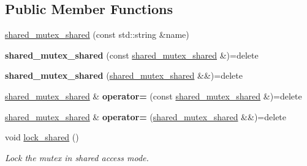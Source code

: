 \subsection*{Public Member Functions}
\begin{DoxyCompactItemize}
\item 
\hyperlink{classcpen333_1_1process_1_1impl_1_1shared__mutex__shared_aa94fee843eb846e57c4ac51589172849}{shared\+\_\+mutex\+\_\+shared} (const std\+::string \&name)
\item 
\mbox{\label{classcpen333_1_1process_1_1impl_1_1shared__mutex__shared_a1a1a4c997212a30de0acffdb151a6784}} 
{\bfseries shared\+\_\+mutex\+\_\+shared} (const \hyperlink{classcpen333_1_1process_1_1impl_1_1shared__mutex__shared}{shared\+\_\+mutex\+\_\+shared} \&)=delete
\item 
\mbox{\label{classcpen333_1_1process_1_1impl_1_1shared__mutex__shared_aeb8440ba1ac5d0f4976f592ca22af915}} 
{\bfseries shared\+\_\+mutex\+\_\+shared} (\hyperlink{classcpen333_1_1process_1_1impl_1_1shared__mutex__shared}{shared\+\_\+mutex\+\_\+shared} \&\&)=delete
\item 
\mbox{\label{classcpen333_1_1process_1_1impl_1_1shared__mutex__shared_af749d860d3161ffe5a5f0059f47b3e6a}} 
\hyperlink{classcpen333_1_1process_1_1impl_1_1shared__mutex__shared}{shared\+\_\+mutex\+\_\+shared} \& {\bfseries operator=} (const \hyperlink{classcpen333_1_1process_1_1impl_1_1shared__mutex__shared}{shared\+\_\+mutex\+\_\+shared} \&)=delete
\item 
\mbox{\label{classcpen333_1_1process_1_1impl_1_1shared__mutex__shared_afe0a4dae3afe6aa50ab7917c78369486}} 
\hyperlink{classcpen333_1_1process_1_1impl_1_1shared__mutex__shared}{shared\+\_\+mutex\+\_\+shared} \& {\bfseries operator=} (\hyperlink{classcpen333_1_1process_1_1impl_1_1shared__mutex__shared}{shared\+\_\+mutex\+\_\+shared} \&\&)=delete
\item 
void \hyperlink{classcpen333_1_1process_1_1impl_1_1shared__mutex__shared_a29036d76ee3f41ae157bb87b4316ea97}{lock\+\_\+shared} ()
\begin{DoxyCompactList}\small\item\em Lock the mutex in shared access mode. \end{DoxyCompactList}\item 

\end{DoxyCompactItemize}
